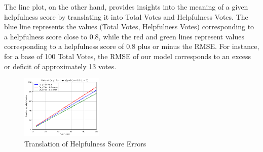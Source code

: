 \noindent
The line plot, on the other hand, provides insights into the meaning of a given helpfulness score by translating it into Total
Votes and Helpfulness Votes. The blue line represents the values (Total Votes, Helpfulness Votes) corresponding to a helpfulness
score close to 0.8, while the red and green lines represent values corresponding to a helpfulness score of 0.8 plus or minus the RMSE.
For instance, for a base of 100 Total Votes, the RMSE of our model corresponds to an excess or deficit of approximately 13 votes.

\begin{figure}[H]
    \centering
    \includegraphics[width=0.35\textwidth]{./figures/model_best_lines.png}
    \caption{Translation of Helpfulness Score Errors}
    \label{fig:model_best_lines}
\end{figure}





